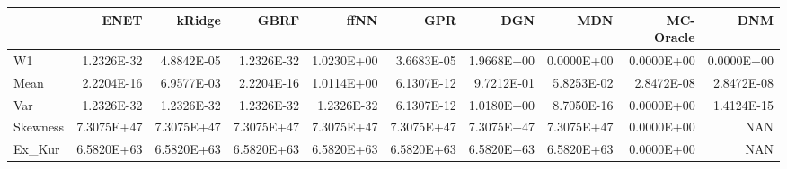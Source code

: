 \begin{tabular}{lrrrrrrrrr}
\toprule
{} &       ENET &     kRidge &       GBRF &       ffNN &        GPR &        DGN &        MDN &  MC-Oracle &        DNM \\
\midrule
W1       & 1.2326E-32 & 4.8842E-05 & 1.2326E-32 & 1.0230E+00 & 3.6683E-05 & 1.9668E+00 & 0.0000E+00 & 0.0000E+00 & 0.0000E+00 \\
Mean     & 2.2204E-16 & 6.9577E-03 & 2.2204E-16 & 1.0114E+00 & 6.1307E-12 & 9.7212E-01 & 5.8253E-02 & 2.8472E-08 & 2.8472E-08 \\
Var      & 1.2326E-32 & 1.2326E-32 & 1.2326E-32 & 1.2326E-32 & 6.1307E-12 & 1.0180E+00 & 8.7050E-16 & 0.0000E+00 & 1.4124E-15 \\
Skewness & 7.3075E+47 & 7.3075E+47 & 7.3075E+47 & 7.3075E+47 & 7.3075E+47 & 7.3075E+47 & 7.3075E+47 & 0.0000E+00 &        NAN \\
Ex\_Kur   & 6.5820E+63 & 6.5820E+63 & 6.5820E+63 & 6.5820E+63 & 6.5820E+63 & 6.5820E+63 & 6.5820E+63 & 0.0000E+00 &        NAN \\
\bottomrule
\end{tabular}
